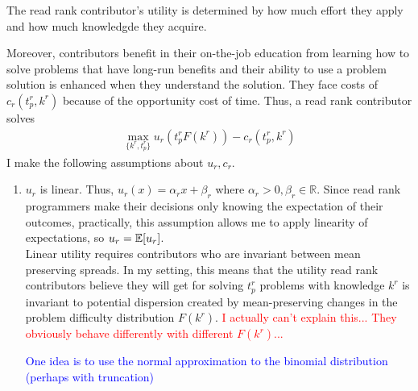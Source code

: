 \documentclass[source/paper/main.tex]{subfiles}
\begin{document}
\qquad The read rank contributor's utility is determined by how much effort they apply and how much knowledgde they acquire. 

Moreover, contributors benefit in their on-the-job education from learning how to solve problems that have long-run benefits and their ability to use a problem solution is enhanced when they understand the solution. They face costs of $c_r(t_p^r, k^r)$ because of the opportunity cost of time. Thus, a read rank contributor solves 
\begin{align}
    \max_{\{k^r, t_p^r\}} u_r\left( t_p^rF(k^r)  \right) - c_r(t_p^r, k^r) \label{read_rank_problem}
\end{align}
I make the following assumptions about $u_r, c_r$. 
\begin{enumerate}
    \item $u_r$ is linear. Thus, $u_r(x) = \alpha_r x + \beta_r$ where $\alpha_r > 0, \beta_r \in \mathbb{R}$. Since read rank programmers make their decisions only knowing the expectation of their outcomes, practically, this assumption allows me to apply linearity of expectations, so $u_r = \mathbb{E}[u_r]$. \\
    
    Linear utility requires contributors who are invariant between mean preserving spreads. In my setting, this means that the utility read rank contributors believe they will get for solving $t_p^r$ problems with knowledge $k^r$ is invariant to potential dispersion created by mean-preserving changes in the problem difficulty distribution $F(k^r)$. \textcolor{red}{I actually can't explain this... They obviously behave differently with different $F(k^r)$...}

    \textcolor{blue}{One idea is to use the normal approximation to the binomial distribution (perhaps with truncation)}


\end{enumerate}
\end{document}
